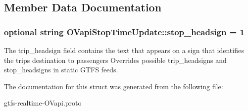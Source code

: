 \subsection{Member Data Documentation}
\subsubsection[{\texorpdfstring{stop\+\_\+headsign}{stop_headsign}}]{\setlength{\rightskip}{0pt plus 5cm}optional string O\+Vapi\+Stop\+Time\+Update\+::stop\+\_\+headsign = 1}\hypertarget{structOVapiStopTimeUpdate_af56f2bfaef6f7f4718ab363d931c91a1}{}\label{structOVapiStopTimeUpdate_af56f2bfaef6f7f4718ab363d931c91a1}


The trip\+\_\+headsign field contains the text that appears on a sign that identifies the trip\textquotesingle{}s destination to passengers Overrides possible trip\+\_\+headsign\textquotesingle{}s and stop\+\_\+headsign\textquotesingle{}s in static G\+T\+FS feeds. 



The documentation for this struct was generated from the following file\+:\begin{DoxyCompactItemize}
\item 
gtfs-\/realtime-\/\+O\+Vapi.\+proto\end{DoxyCompactItemize}
